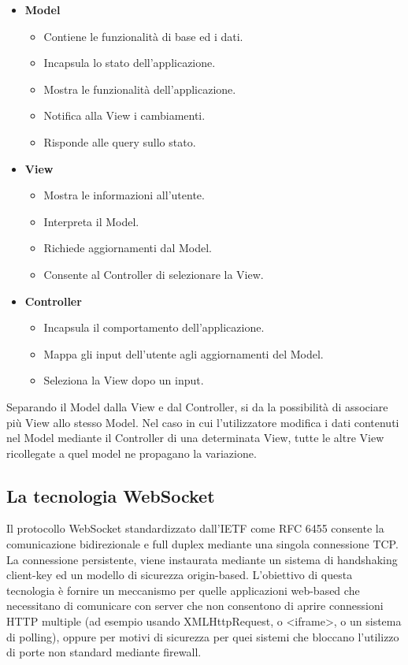 \documentclass[11pt]{article}
\begin{document}
\begin{itemize}
\item \textbf{Model}
\begin{itemize}
	\item Contiene le funzionalità di base ed i dati.
	\item Incapsula lo stato dell'applicazione.
	\item Mostra le funzionalità dell'applicazione.
	\item Notifica alla View i cambiamenti.
	\item Risponde alle query sullo stato. 
\end{itemize}
\item \textbf{View}
\begin{itemize}
	\item Mostra le informazioni all'utente.
	\item Interpreta il Model.
	\item Richiede aggiornamenti dal Model.
	\item Consente al Controller di selezionare la View.
\end{itemize}
\item \textbf{Controller}
\begin{itemize}
	\item Incapsula il comportamento dell'applicazione.
	\item Mappa gli input dell'utente agli aggiornamenti del Model.
	\item Seleziona la View dopo un input.
\end{itemize}
\end{itemize}
Separando il Model dalla View e dal Controller, si da la possibilità di associare più View allo stesso Model. Nel caso in cui l'utilizzatore modifica i dati contenuti nel Model mediante il Controller di una determinata
View, tutte le altre View ricollegate a quel model ne propagano la variazione.

\subsection{La tecnologia WebSocket}
Il protocollo WebSocket standardizzato dall'IETF come RFC 6455 consente la comunicazione bidirezionale e full duplex mediante una singola connessione TCP. La connessione persistente, viene instaurata mediante un sistema di handshaking client-key ed un modello di sicurezza origin-based. L'obiettivo di questa tecnologia è fornire un meccanismo per quelle applicazioni web-based che necessitano di comunicare con server che non consentono di aprire connessioni HTTP multiple (ad esempio usando XMLHttpRequest, o <iframe>, o un sistema di polling), oppure per motivi di sicurezza per quei sistemi che bloccano l'utilizzo di porte non standard mediante firewall.
\end{document}
